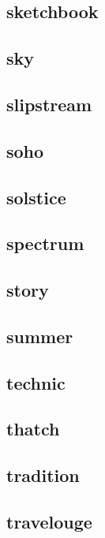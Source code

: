 \subsection{\ttfamily sketchbook}
\newpage
\subsection{\ttfamily sky}
\newpage
\subsection{\ttfamily slipstream}
\newpage
\subsection{\ttfamily soho}
\newpage
\subsection{\ttfamily solstice}
\newpage
\subsection{\ttfamily spectrum}
\newpage
\subsection{\ttfamily story}
\newpage
\subsection{\ttfamily summer}
\newpage
\subsection{\ttfamily technic}
\newpage
\subsection{\ttfamily thatch}
\newpage
\subsection{\ttfamily tradition}
\newpage
\subsection{\ttfamily travelouge}
\newpage
